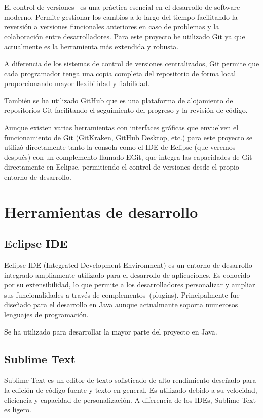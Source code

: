 El control de versiones~\cite{atlassian:controldeversiones} es una práctica esencial en el desarrollo de software moderno. Permite gestionar los cambios a lo largo del tiempo facilitando la reversión a versiones funcionales anteriores en caso de problemas y la colaboración entre desarrolladores. Para este proyecto he utilizado Git ya que actualmente es la herramienta más extendida y robusta.

A diferencia de los sistemas de control de versiones centralizados, Git permite que cada programador tenga una copia completa del repositorio de forma local proporcionando mayor flexibilidad y fiabilidad.

También se ha utilizado GitHub que es una plataforma de alojamiento de repositorios Git facilitando el seguimiento del progreso y la revisión de código.

Aunque existen varias herramientas con interfaces gráficas que envuelven el funcionamiento de Git (GitKraken, GitHub Desktop, etc.) para este proyecto se utilizó directamente tanto la consola como el IDE de Eclipse (que veremos después) con un complemento llamado EGit, que integra las capacidades de Git directamente en Eclipse, permitiendo el control de versiones desde el propio entorno de desarrollo.

\section{Herramientas de desarrollo}

\subsection{Eclipse IDE}

Eclipse IDE (Integrated Development Environment) es un entorno de desarrollo integrado ampliamente utilizado para el desarrollo de aplicaciones. Es conocido por su extensibilidad, lo que permite a los desarrolladores personalizar y ampliar sus funcionalidades a través de complementos~(plugins). Principalmente fue diseñado para el desarrollo en Java aunque actualmante soporta numerosos lenguajes de programación.

Se ha utilizado para desarrollar la mayor parte del proyecto en Java.

\subsection{Sublime Text}

Sublime Text es un editor de texto sofisticado de alto rendimiento deseñado para la edición de código fuente y texto en general. Es utilizado debido a su velocidad, eficiencia y capacidad de personalización. A diferencia de los IDEs, Sublime Text es ligero.

